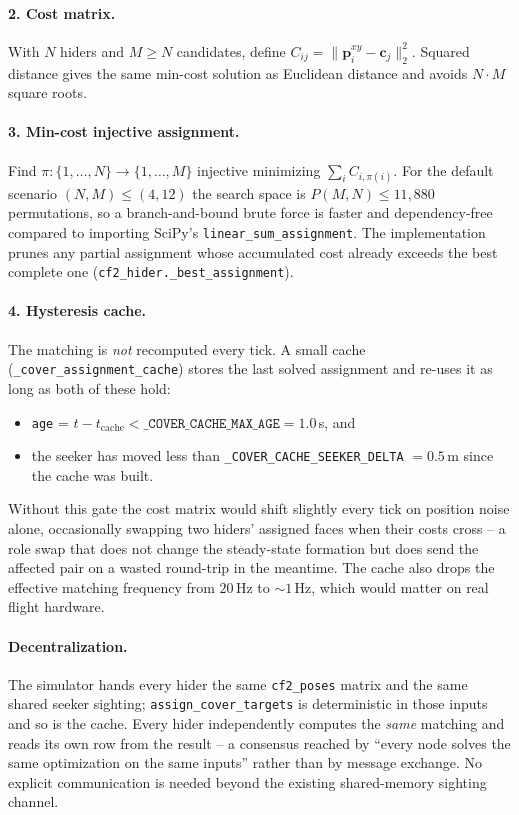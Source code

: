 \documentclass[11pt,a4paper]{article}
\newcommand{\code}[1]{\texttt{#1}}
\newcommand{\vect}[1]{\mathbf{#1}}
\begin{document}
\paragraph{2. Cost matrix.}
With $N$ hiders and $M \ge N$ candidates, define
\(
    C_{ij} = \|\vect{p}_i^{xy} - \vect{c}_j\|_2^2.
\)
Squared distance gives the same min-cost solution as Euclidean distance and
avoids $N \cdot M$ square roots.

\paragraph{3. Min-cost injective assignment.}
Find $\pi : \{1,\dots,N\} \to \{1,\dots,M\}$ injective minimizing $\sum_i
C_{i,\pi(i)}$. For the default scenario $(N, M) \le (4, 12)$ the search space
is $P(M, N) \le 11{,}880$ permutations, so a branch-and-bound brute force is
faster and dependency-free compared to importing SciPy's
\code{linear\_sum\_assignment}. The implementation prunes any partial
assignment whose accumulated cost already exceeds the best complete one
(\code{cf2\_hider.\_best\_assignment}).

\paragraph{4. Hysteresis cache.}
The matching is \emph{not} recomputed every tick. A small cache
(\code{\_cover\_assignment\_cache}) stores the last solved assignment and
re-uses it as long as both of these hold:
\begin{itemize}[leftmargin=1.4em,topsep=2pt]
  \item \code{age} = $t - t_\mathrm{cache} < \code{\_COVER\_CACHE\_MAX\_AGE}
        = 1.0$\,s, and
  \item the seeker has moved less than
        \code{\_COVER\_CACHE\_SEEKER\_DELTA} $= 0.5$\,m since the cache was
        built.
\end{itemize}
Without this gate the cost matrix would shift slightly every tick on
position noise alone, occasionally swapping two hiders' assigned faces
when their costs cross -- a role swap that does not change the steady-state
formation but does send the affected pair on a wasted round-trip in the
meantime. The cache also drops the effective matching frequency from
$20$\,Hz to $\sim 1$\,Hz, which would matter on real flight hardware.

\paragraph{Decentralization.}
The simulator hands every hider the same \code{cf2\_poses} matrix and the
same shared seeker sighting; \code{assign\_cover\_targets} is deterministic
in those inputs and so is the cache. Every hider independently computes the
\emph{same} matching and reads its own row from the result -- a consensus
reached by ``every node solves the same optimization on the same inputs''
rather than by message exchange. No explicit communication is needed beyond
the existing shared-memory sighting channel.
\end{document}
